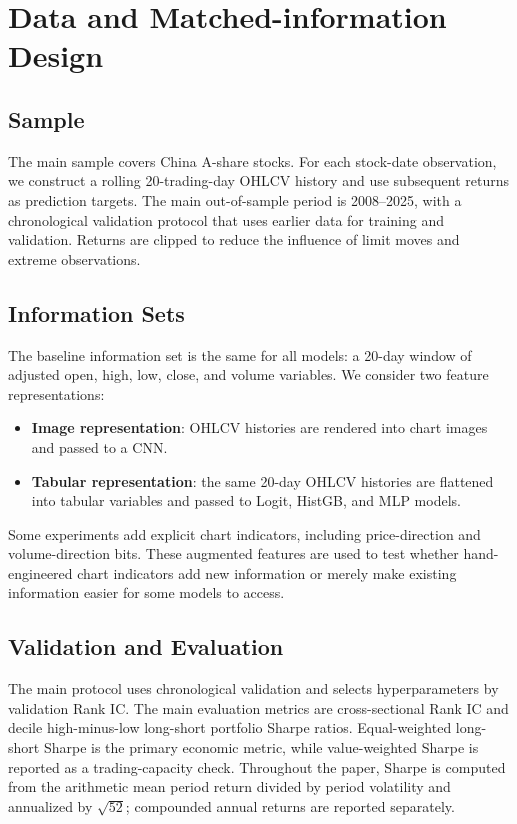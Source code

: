 \section{Data and Matched-information Design}

\subsection{Sample}

The main sample covers China A-share stocks. For each stock-date observation, we construct a rolling 20-trading-day OHLCV history and use subsequent returns as prediction targets. The main out-of-sample period is 2008--2025, with a chronological validation protocol that uses earlier data for training and validation. Returns are clipped to reduce the influence of limit moves and extreme observations.

\subsection{Information Sets}

The baseline information set is the same for all models: a 20-day window of adjusted open, high, low, close, and volume variables. We consider two feature representations:

\begin{itemize}
  \item \textbf{Image representation}: OHLCV histories are rendered into chart images and passed to a CNN.
  \item \textbf{Tabular representation}: the same 20-day OHLCV histories are flattened into tabular variables and passed to Logit, HistGB, and MLP models.
\end{itemize}

Some experiments add explicit chart indicators, including price-direction and volume-direction bits. These augmented features are used to test whether hand-engineered chart indicators add new information or merely make existing information easier for some models to access.

\subsection{Validation and Evaluation}

The main protocol uses chronological validation and selects hyperparameters by validation Rank IC. The main evaluation metrics are cross-sectional Rank IC and decile high-minus-low long-short portfolio Sharpe ratios. Equal-weighted long-short Sharpe is the primary economic metric, while value-weighted Sharpe is reported as a trading-capacity check. Throughout the paper, Sharpe is computed from the arithmetic mean period return divided by period volatility and annualized by $\sqrt{52}$; compounded annual returns are reported separately.

